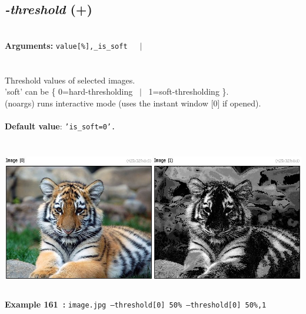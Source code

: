 \documentclass[a4paper,11pt,twoside]{book}
\begin{document}
\subsection{\emph{-threshold} (+)}\vspace*{-0.5em}
~\\\textbf{Arguments: } 
{\small \texttt{value[\%],\_is\_soft}}~~~$|$\\
\\~\\
Threshold values of selected images.
~\\'soft' can be \{ 0=hard-thresholding ~$|$~ 1=soft-thresholding \}.
~\\(noargs) runs interactive mode (uses the instant window [0] if opened).
~\\~\\\textbf{Default value}: {\small \texttt{'is\_soft=0'.}}
\begin{center}\includegraphics[keepaspectratio=true,height=7cm,width=\textwidth]{img/gmic_def161.jpg}\\
{\footnotesize \textbf{Example 161~:} \texttt{image.jpg --threshold[0] 50\% --threshold[0] 50\%,1}}
\end{center}
\end{document}
